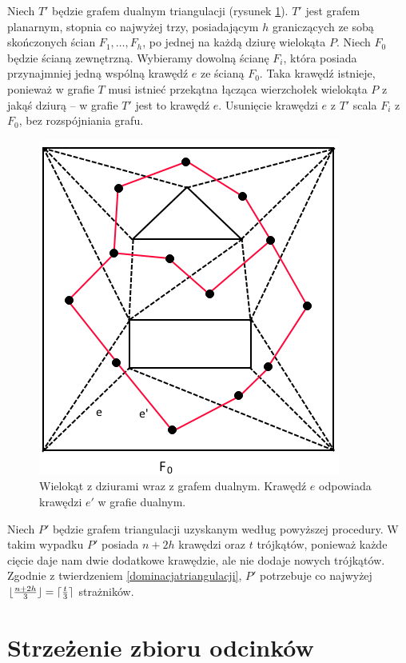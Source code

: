\documentclass[brudnopis]{xmgr}
\DeclarePairedDelimiter\ceil{\lceil}{\rceil}
\DeclarePairedDelimiter\floor{\lfloor}{\rfloor}
\theoremstyle{definition}
\begin{document}
\indent Niech $T'$ będzie grafem dualnym triangulacji (rysunek \ref{fig:triangulacja}). $T'$ jest grafem planarnym, stopnia co najwyżej trzy, posiadającym $h$ graniczących ze sobą skończonych ścian $F_1, \ldots, F_h$, po jednej na każdą dziurę wielokąta $P$. Niech $F_0$ będzie ścianą zewnętrzną. Wybieramy dowolną ścianę $F_i$, która posiada przynajmniej jedną wspólną krawędź $e$ ze ścianą $F_0$. Taka krawędź istnieje, ponieważ w grafie $T$ musi istnieć przekątna łącząca wierzchołek wielokąta $P$ z jakąś dziurą -- w grafie $T'$ jest to krawędź $e$. Usunięcie krawędzi $e$ z $T'$ scala $F_i$ z $F_0$, bez rozspójniania grafu.

\begin{figure}[h!]
  \centering
    \includegraphics{rysunki/triangulacja_dziury.png}
    \caption{Wielokąt z dziurami wraz z grafem dualnym. Krawędź $e$ odpowiada krawędzi $e'$ w grafie dualnym.}
    \label{fig:triangulacja}
    \vspace{4in}
\end{figure} 

\indent Niech $P'$ będzie grafem triangulacji uzyskanym według powyższej procedury. W takim wypadku $P'$ posiada $n + 2h$ krawędzi oraz $t$ trójkątów, ponieważ każde cięcie daje nam dwie dodatkowe krawędzie, ale nie dodaje nowych trójkątów. Zgodnie z twierdzeniem \ref{dominacjatriangulacji}, $P'$ potrzebuje co najwyżej $\floor{\frac{n+2h}{3}} = \ceil{\frac{t}{3}}$ strażników.

\chapter{Strzeżenie zbioru odcinków}
\end{document}
